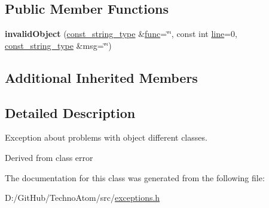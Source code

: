 \subsection*{Public Member Functions}
\begin{DoxyCompactItemize}
\item 
\mbox{\label{classatom_1_1invalid_object_a70f97b01ac566e63753ee29e6e862228}} 
{\bfseries invalid\+Object} (\hyperlink{classatom_1_1error_ac330e9fb7cedcf4a173c5eb156d7bdaf}{const\+\_\+string\+\_\+type} \&\hyperlink{classatom_1_1error_a0a70a92b1638bfe4be7972651ae0c5c8}{func}=\char`\"{}\char`\"{}, const int \hyperlink{classatom_1_1error_aa9443d1a458d0dc6086372444a58e8c6}{line}=0, \hyperlink{classatom_1_1error_ac330e9fb7cedcf4a173c5eb156d7bdaf}{const\+\_\+string\+\_\+type} \&msg=\char`\"{}\char`\"{})
\end{DoxyCompactItemize}
\subsection*{Additional Inherited Members}


\subsection{Detailed Description}
Exception about problems with object different classes. 

Derived from class error 

The documentation for this class was generated from the following file\+:\begin{DoxyCompactItemize}
\item 
D\+:/\+Git\+Hub/\+Techno\+Atom/src/\hyperlink{exceptions_8h}{exceptions.\+h}\end{DoxyCompactItemize}
